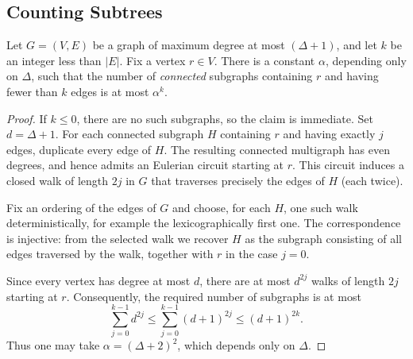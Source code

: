 \subsection{Counting Subtrees}

\begin{claim}
  \label{claim:counting_trees}
  Let $G=(V,E)$ be a graph of maximum degree at most $(\Delta+1)$, and let $k$ be an
  integer less than $|E|$. Fix a vertex $r\in V$. There is a constant
  $\alpha$, depending only on $\Delta$, such that the number of
  \emph{connected} subgraphs containing $r$ and having fewer than $k$
  edges is at most $\alpha^k$.
\end{claim}

\begin{proof}
  If $k\le 0$, there are no such subgraphs, so the claim is immediate.
  Set $d=\Delta+1$. For each connected subgraph $H$ containing $r$ and
  having exactly $j$ edges, duplicate every edge of $H$. The resulting
  connected multigraph has even degrees, and hence admits an Eulerian
  circuit starting at $r$. This circuit induces a closed walk of length
  $2j$ in $G$ that traverses precisely the edges of $H$ (each twice).

  Fix an ordering of the edges of $G$ and choose, for each $H$, one such
  walk deterministically, for example the lexicographically first one.
  The correspondence is injective: from the selected walk we recover
  $H$ as the subgraph consisting of all edges traversed by the walk,
  together with $r$ in the case $j=0$.

  Since every vertex has degree at most $d$, there are at most $d^{2j}$ walks
  of length $2j$ starting at $r$. Consequently, the required number
  of subgraphs is at most
  \[
    \sum_{j=0}^{k-1}d^{2j}
    \le \sum_{j=0}^{k-1}(d+1)^{2j}
    \le (d+1)^{2k}.
  \]
  Thus one may take $\alpha=(\Delta+2)^2$, which depends only on
  $\Delta$.
\end{proof}
